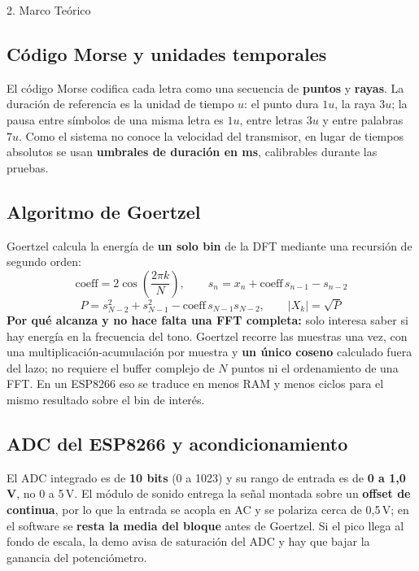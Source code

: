 \documentclass[final]{beamer}
\newlength{\onecolwid}
\newlength{\twocolwid}
\begin{document}
\begin{frame}[t]
\begin{columns}[t]
\begin{column}{\twocolwid}
\begin{columns}[t,totalwidth=\twocolwid]
\begin{column}{\onecolwid}\vspace{-.6in}

\begin{block}{2. Marco Teórico}

\subsection*{Código Morse y unidades temporales}
El código Morse codifica cada letra como una secuencia de \textbf{puntos} y \textbf{rayas}. La duración de referencia es la unidad de tiempo $u$: el punto dura $1u$, la raya $3u$; la pausa entre símbolos de una misma letra es $1u$, entre letras $3u$ y entre palabras $7u$. Como el sistema no conoce la velocidad del transmisor, en lugar de tiempos absolutos se usan \textbf{umbrales de duración en ms}, calibrables durante las pruebas.

\subsection*{Algoritmo de Goertzel}
Goertzel calcula la energía de \textbf{un solo bin} de la DFT mediante una recursión de segundo orden:
\[
\mathrm{coeff} = 2\cos\!\left(\frac{2\pi k}{N}\right),\qquad
s_n = x_n + \mathrm{coeff}\,s_{n-1} - s_{n-2}
\]
\[
P = s_{N-2}^{2} + s_{N-1}^{2} - \mathrm{coeff}\,s_{N-1}s_{N-2},\qquad
|X_k| = \sqrt{P}
\]
\textbf{Por qué alcanza y no hace falta una FFT completa:} solo interesa saber si hay energía en la frecuencia del tono. Goertzel recorre las muestras una vez, con una multiplicación-acumulación por muestra y \textbf{un único coseno} calculado fuera del lazo; no requiere el buffer complejo de $N$ puntos ni el ordenamiento de una FFT. En un ESP8266 eso se traduce en menos RAM y menos ciclos para el mismo resultado sobre el bin de interés.

\subsection*{ADC del ESP8266 y acondicionamiento}
El ADC integrado es de \textbf{10 bits} (0 a 1023) y su rango de entrada es de \textbf{0 a 1{,}0\,V}, no 0 a 5\,V. El módulo de sonido entrega la señal montada sobre un \textbf{offset de continua}, por lo que la entrada se acopla en AC y se polariza cerca de 0{,}5\,V; en el software se \textbf{resta la media del bloque} antes de Goertzel. Si el pico llega al fondo de escala, la demo avisa de saturación del ADC y hay que bajar la ganancia del potenciómetro.


\end{block}
\end{column}
\end{columns}
\end{column}
\end{columns}
\end{frame}
\end{document}

